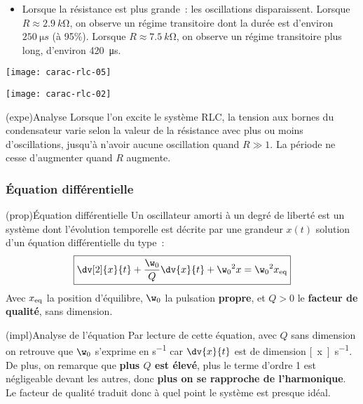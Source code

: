 \documentclass[../../main/main.tex]{subfiles}
\begin{document}
\begin{itemize}
	\item Lorsque la résistance est plus grande~: les oscillations
	      disparaissent. Lorsque $R \approx \SI{2,9}{k\ohm}$, on observe un régime
	      transitoire dont la durée est d’environ $\SI{250}{\micro s}$ (à 95\%).
	      Lorsque $R \approx \SI{7.5}{k\ohm}$, on observe un régime transitoire
	      plus long, d’environ \SI{420}{\micro s}.
\end{itemize}
\begin{minipage}{0.45\linewidth}
	\begin{center}
		\texttt{[image: carac-rlc-05]}
	\end{center}
\end{minipage}
\hfill
\begin{minipage}{0.45\linewidth}
	\begin{center}
		\texttt{[image: carac-rlc-02]}
	\end{center}
\end{minipage}

\begin{tcb}(expe){Analyse}
	Lorsque l'on excite le système RLC, la tension aux bornes du condensateur
	varie selon la valeur de la résistance avec plus ou moins d'oscillations,
	jusqu'à n'avoir aucune oscillation quand $R \gg 1$. La période ne cesse
	d'augmenter quand $R$ augmente.
\end{tcb}

\subsubsection{Équation différentielle}

\begin{tcbraster}[raster columns=2, raster equal height=rows]
	\begin{tcb}[label=prop:eqdiffoh](prop){Équation différentielle}
		Un oscillateur amorti à un degré de liberté est un système dont l'évolution
		temporelle est décrite par une grandeur $x(t)$ solution d'un équation
		différentielle du type~:
		\[ \boxed{ \dv[2]{x}{t} + \frac{\w_0}{Q} \dv{x}{t} + \w_0{}^2x = \w_0{}^2x_{\rm eq}}\]
		Avec $x_{\rm eq}$ la position d'équilibre, $\w_0$ la pulsation
		\textbf{propre}, et $Q >0$ le \textbf{facteur de qualité}, sans dimension.
	\end{tcb}
	\begin{tcb}[label=impl:eqdiffamorti](impl){Analyse de l'équation}
		Par lecture de cette équation, avec $Q$ sans dimension on retrouve que
		$\w_0$ s'exprime en \si{s^{-1}} car $\dv{x}{t}$ est de dimension
		\si{[x].s^{-1}}.\bigbreak
		De plus, on remarque que \textbf{plus $Q$ est élevé}, plus le terme
		d'ordre 1 est négligeable devant les autres, donc \textbf{plus on se
			rapproche de l'harmonique}. Le facteur de qualité traduit donc à quel
		point le système est presque idéal.
	\end{tcb}
\end{tcbraster}
\end{document}
